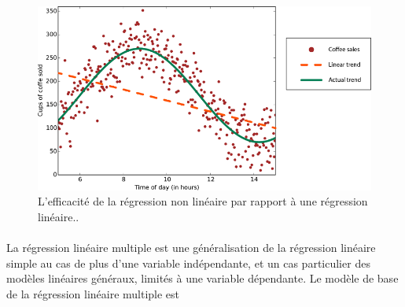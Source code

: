 			
	\begin{figure}[hth]%
		\centering
		\includegraphics[width=\textwidth]{images/nonlinear-trend.png}
		\caption{ L'efficacité de la régression non linéaire par rapport \`{a} une régression linéaire..}
		\label{fig:nonlinear_trend}
	\end{figure}

	\paragraph*{}
	La régression linéaire multiple est une généralisation de la régression linéaire simple au cas de plus d'une variable indépendante, et un cas particulier des modèles linéaires généraux, limités à une variable dépendante. Le modèle de base de la régression linéaire multiple est
	
